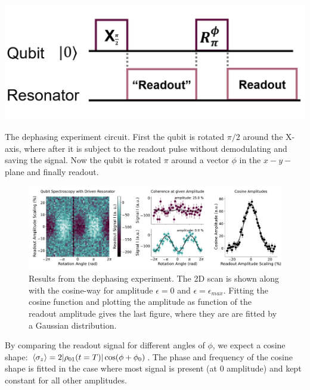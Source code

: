 \begin{marginfigure}[-6 cm]
    \centering
    \includegraphics[]{Figs/circuits/dephasing.png}
    \caption{The dephasing experiment circuit. First the qubit is rotated $\pi/2$ around the X-axis, where after it is subject to the readout pulse without demodulating and saving the signal. Now the qubit is rotated $\pi$ around a vector $\phi$ in the $x-y-$plane and finally readout.}
    \label{fig:efficiency_dephasing_experiment}
\end{marginfigure}
\begin{figure}
    \centering
    \includegraphics{Calibrations/Figures/dephasing_by_measurement.pdf}
    \caption{Results from the dephasing experiment. The 2D scan is shown along with the cosine-way for amplitude $\epsilon = 0$ and $\epsilon = \epsilon_{max}$. Fitting the cosine function and plotting the amplitude as function of the readout amplitude gives the last figure, where they are are fitted by a Gaussian distribution.}
    \label{fig:efficiency_dephasing_result}
\end{figure}

By comparing the readout signal for different angles of $\phi$, we expect a cosine shape: $\expval{\sigma_z} = 2 |\rho_{01}(t= T)| \cos(\phi+\phi_0)$. The phase and frequency of the cosine shape is fitted in the case where most signal is present (at 0 amplitude) and kept constant for all other amplitudes.

